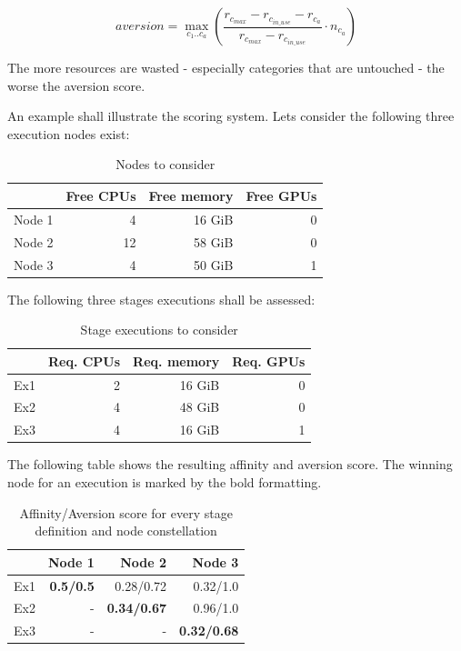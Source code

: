 \begin{equation}
	\label{election:eq:aversion}
	{aversion} = \max_{c_1 .. c_a} \left( \frac{r_{c_{max}} - r_{c_{in\_use}} - r_{c_a}}{r_{c_{max}}  - r_{c_{in\_use}}} \cdot n_{c_a} \right)
\end{equation}

The more resources are wasted - especially categories that are untouched - the worse the aversion score.

An example shall illustrate the scoring system.
Lets consider the following three execution nodes exist:

\begin{table}[H]
	\centering
	\begin{tabular}{l|r|r|r}
		 & Free CPUs & Free memory & Free GPUs \\
		 \hline
		 Node 1 & 4  	& 16 GiB & 0 \\
		 Node 2 & 12 	& 58 GiB & 0 \\
		 Node 3 & 4 	& 50 GiB & 1 \\
	\end{tabular}
	\caption{Nodes to consider}
\end{table}

The following three stages executions shall be assessed:

\begin{table}[H]
	\centering
	\begin{tabular}{l|r|r|r}
		& Req. CPUs & Req. memory & Req. GPUs \\
		\hline
		Ex1 & 2 & 16 GiB & 0 \\
		Ex2 & 4 & 48 GiB & 0 \\
		Ex3 & 4 & 16 GiB & 1 \\
	\end{tabular}
	\caption{Stage executions to consider}
\end{table}

The following table shows the resulting affinity and aversion score.
The winning node for an execution is marked by the bold formatting.


\begin{table}[H]
	\centering
	\begin{tabular}{l|r|r|r}
		& Node 1 & Node 2 & Node 3 \\
		\hline
		Ex1 & \textbf{0.5/0.5}	& 		  0.28/0.72	& 		  0.32/1.0 \\
		Ex2 & - 				& \textbf{0.34/0.67}& 		  0.96/1.0 \\
		Ex3 & - 				& - 				& \textbf{0.32/0.68} \\
	\end{tabular}
	\caption{Affinity/Aversion score for every stage definition and node constellation}
\end{table}

